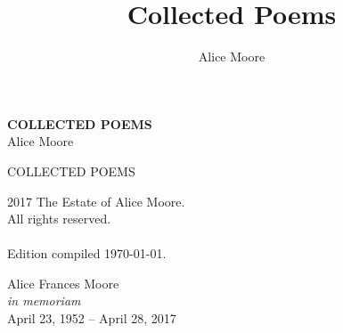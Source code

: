 \documentclass[twoside,openright,final,11pt]{memoir}
\title{Collected Poems}
\author{Alice Moore}
\date{}
\begin{document}
\setlength\epigraphwidth{5cm}
\setlength\epigraphrule{0pt}
\epigraphfontsize{\footnotesize}

\setlength\vgap{2.5em}
\setlength\vleftskip{0.5em}

\PlainPoemTitle

\renewcommand{\printPoemTitletitle}[1]{\PoemTitlefont \uppercase{#1}}

\pagestyle{empty}

\frontmatter

\begin{titlingpage}
\begingroup
\newlength{\drop}
\setlength{\drop}{0.12\textheight}
\vspace*{\drop}
\begin{center}
{\Huge \textbf{COLLECTED POEMS}}\\
\vspace{2\baselineskip}
{\LARGE Alice Moore}
\end{center}
\endgroup

\clearpage

\begingroup
\footnotesize
\begin{flushleft}
\textsc{COLLECTED POEMS}

\textcopyright{} 2017 The Estate of Alice Moore.\\
All rights reserved.\\
~\\
Edition compiled \today.
\end{flushleft}
\endgroup
\end{titlingpage}

\begingroup
\clearpage
\null\vspace{0.3\textheight}
\begin{center}
Alice Frances Moore\\
\textit{in memoriam}\\
April 23, 1952 -- April 28, 2017
\end{center}
\vfill\cleardoublepage
\endgroup

\setlength{\cftsectionindent}{3.8em}
\setlength{\cftsubsectionindent}{7.0em}
\tableofcontents*
\clearpage

\renewcommand*{\printbookname}{}
\renewcommand*{\printbooknum}{}
\renewcommand*{\printpartnum}{}
\renewcommand*{\printpartname}{}

\renewcommand{\booktitlefont}{\normalfont\Huge\scshape}

\end{document}
